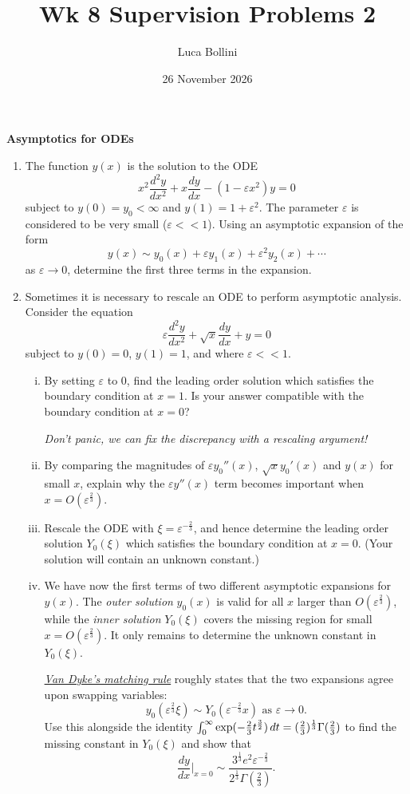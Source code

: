 \documentclass{article}
\title{Wk 8 Supervision Problems 2}
\author{Luca Bollini}
\date{26 November 2026}
\newcommand{\eps}{\varepsilon}
\newcommand{\ts}{\thinspace}
\begin{document}
\maketitle

\begin{center}
\huge{\textbf{Asymptotics for ODEs}}
\end{center}

\begin{enumerate}
    \item The function $y(x)$ is the solution to the ODE
    \[
    x^2\frac{d^2y}{dx^2} + x\frac{dy}{dx} - (1-\eps x^2)y = 0
    \]
    subject to $y(0) = y_0<\infty$ and $y(1)=1+\eps^2$. The parameter $\eps$ is considered to be very small ($\eps<<1$). Using an asymptotic expansion of the form
    \[
    y(x) \sim y_0(x) + \eps y_1(x) + \eps^2 y_2(x) + \cdots
    \]
    as $\eps\to 0$, determine the first three terms in the expansion.

    \item     
    Sometimes it is necessary to rescale an ODE to perform asymptotic analysis. Consider the equation
    \[
    \eps\frac{d^2y}{dx^2} +\sqrt x \frac{dy}{dx} + y = 0
    \]
    subject to $y(0)=0$, $y(1)=1$, and where $\eps<<1$.
    \begin{enumerate}[(i)]
        \item By setting $\eps$ to 0, find the leading order solution which satisfies the boundary condition at $x=1$. Is your answer compatible with the boundary condition at $x=0$?

        \emph{Don't panic, we can fix the discrepancy with a rescaling argument!}
        
        \item By comparing the magnitudes of $\eps y_0''(x)$, $\sqrt x y_0'(x)$ and $y(x)$ for small $x$, explain why the $\eps y''(x)$ term becomes important when $x=O(\eps^\frac23)$.

        \item Rescale the ODE with $\xi = \eps^{-\frac{2}{3}}$, and hence determine the leading order solution $Y_0(\xi)$ which satisfies the boundary condition at $x=0$. (Your solution will contain an unknown constant.)

        \item We have now the first terms of two different asymptotic expansions for $y(x)$. The \emph{outer solution} $y_0(x)$ is valid for all $x$ larger than $O(\eps^\frac23)$, while the \emph{inner solution} $Y_0(\xi)$ covers the missing region for small $x=O(\eps^\frac23)$. It only remains to determine the unknown constant in $Y_0(\xi)$.

        \underline{\emph{Van Dyke's matching rule}} roughly states that the two expansions agree upon swapping variables:
        \[
        y_0(\eps^\frac23 \xi) \sim Y_0(\eps^{-\frac23}x) \text{ as } \eps\to 0.
        \]
        Use this alongside the identity $\int_0^\infty \exp(-\frac23t^\frac32) \ts dt = (\frac23)^\frac13 \Gamma(\frac23)$ to find the missing constant in $Y_0(\xi)$ and show that
        \[
        \frac{dy}{dx}\bigg|_{x=0} \sim \frac{3^\frac13e^2\eps^{-\frac23}}{2^\frac13\Gamma(\frac23)}.
        \]
    \end{enumerate}
\end{enumerate}
\end{document}

